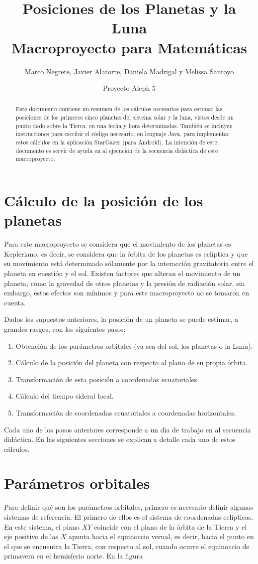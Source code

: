 \documentclass[a4paper,10pt]{article}
\title{Posiciones de los Planetas y la Luna \\ Macroproyecto para Matemáticas}
\author{Marco Negrete, Javier Alatorre, Daniela Madrigal y Melissa Santoyo}
\date{Proyecto Aleph 5}
\begin{document}
\renewcommand{\tablename}{Tabla}
\renewcommand{\BOthers}[1]{et al.\hbox{}}
\maketitle

\begin{abstract}
  Este documento contiene un resumen de los cálculos necesarios para estimar las posiciones de los primeros cinco planetas del sistema solar y la luna, vistos desde un punto dado sobre la Tierra, en una fecha y hora determinadas. También se incluyen instrucciones para escribir el código necesario, en lenguaje Java, para implementar estos cálculos en la aplicación StarGazer (para Android). La intención de este documento es servir de ayuda en al ejecución de la secuencia didáctica de este macroproyecto. 
\end{abstract}

\section{Cálculo de la posición de los planetas}
Para este macroproyecto se considera que el movimiento de los planetas es Kepleriano, es decir, se considera que la órbita de los planetas es eclíptica y que su movimiento está determinado sólamente por la interacción gravitatoria entre el planeta en cuestión y el sol. Existen factores que alteran el movimiento de un planeta, como la gravedad de otros planetas y la presión de radiación solar, sin embargo, estos efectos son mínimos y para este macroproyecto no se tomaron en cuenta. 

Dados los supuestos anteriores, la posición de un planeta se puede estimar, a grandes rasgos, con los siguientes pasos:
\begin{enumerate}
\item Obtención de los parámetros orbitales (ya sea del sol, los planetas o la Luna).
\item Cálculo de la posición del planeta con respecto al plano de su propia órbita.
\item Transformación de esta posición a coordenadas ecuatoriales.
\item Cálculo del tiempo sideral local.
\item Transformación de coordenadas ecuatoriales a coordenadas horizontales.
\end{enumerate}

Cada uno de los pasos anteriores corresponde a un día de trabajo en al secuencia didáctica. En las siguientes secciones se explican a detalle cada uno de estos cálculos.

\section{Parámetros orbitales}
Para definir qué son los parámetros orbitales, primero es necesario definir algunos sistemas de referencia. El primero de ellos es el sistema de coordenadas eclípticas. En este sistema, el plano $XY$ coincide con el plano de la órbita de la Tierra y el eje positivo de las $X$ apunta hacia el equinoccio vernal, es decir, hacia el punto en el que se encuentra la Tierra, con respecto al sol, cuando ocurre el equinoccio de primavera en el hemisferio norte. En la figura 
\end{document}
